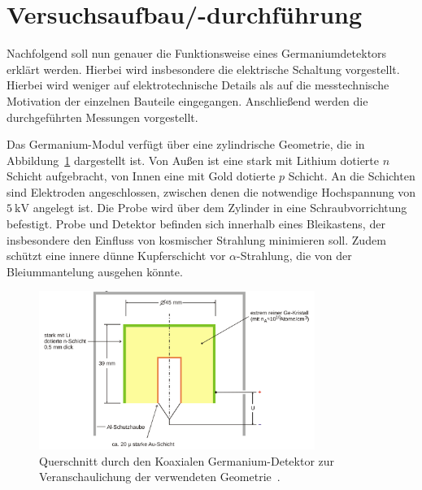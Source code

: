 \section{Versuchsaufbau/-durchführung}
Nachfolgend soll nun genauer die Funktionsweise eines Germaniumdetektors erklärt werden. Hierbei wird insbesondere 
die elektrische Schaltung vorgestellt. Hierbei wird weniger auf elektrotechnische Details 
als auf die messtechnische Motivation der einzelnen Bauteile eingegangen.
Anschließend werden die durchgeführten Messungen vorgestellt.

Das Germanium-Modul verfügt über eine zylindrische Geometrie, die in Abbildung~\ref{fig: geometrie} dargestellt ist. Von Außen ist eine stark mit Lithium dotierte $n$
Schicht aufgebracht, von Innen eine mit Gold dotierte $p$ Schicht. An die Schichten sind Elektroden angeschlossen, zwischen denen 
die notwendige Hochspannung von $\SI{5}{\kilo\volt}$ angelegt ist. Die Probe wird über dem Zylinder in eine Schraubvorrichtung 
befestigt. Probe und Detektor befinden sich innerhalb eines Bleikastens, der insbesondere den Einfluss von kosmischer 
Strahlung minimieren soll. Zudem schützt eine innere dünne Kupferschicht vor $\alpha$-Strahlung, die von der Bleiummantelung ausgehen 
könnte. 
\begin{figure}
\centering
\includegraphics[width = 0.8\textwidth]{pics/geometrie.png}
\caption{Querschnitt durch den Koaxialen Germanium-Detektor zur Veranschaulichung der verwendeten Geometrie~\cite{anleitungv18}.}
\label{fig: geometrie}
\end{figure}


